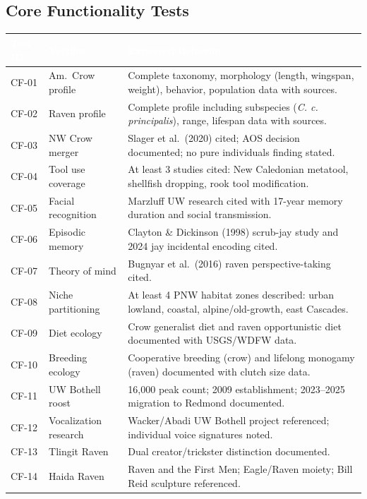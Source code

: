 \documentclass[11pt,letterpaper]{article}
\newcommand{\tableheader}[1]{\textbf{\sffamily\textcolor{white}{#1}}}
\begin{document}
\subsection{Core Functionality Tests}

\begin{center}
\begin{tabularx}{\textwidth}{C{1.2cm}L{3.5cm}X}
\toprule
{}
\tableheader{Test ID} & \tableheader{Verifies} & \tableheader{Expected Behavior} \\
\midrule
CF-01 & Am.\ Crow profile & Complete taxonomy, morphology (length, wingspan, weight), behavior, population data with sources. \\
CF-02 & Raven profile & Complete profile including subspecies (\textit{C. c. principalis}), range, lifespan data with sources. \\
CF-03 & NW Crow merger & Slager et al.\ (2020) cited; AOS decision documented; no pure individuals finding stated. \\
CF-04 & Tool use coverage & At least 3 studies cited: New Caledonian metatool, shellfish dropping, rook tool modification. \\
CF-05 & Facial recognition & Marzluff UW research cited with 17-year memory duration and social transmission. \\
CF-06 & Episodic memory & Clayton \& Dickinson (1998) scrub-jay study and 2024 jay incidental encoding cited. \\
CF-07 & Theory of mind & Bugnyar et al.\ (2016) raven perspective-taking cited. \\
CF-08 & Niche partitioning & At least 4 PNW habitat zones described: urban lowland, coastal, alpine/old-growth, east Cascades. \\
CF-09 & Diet ecology & Crow generalist diet and raven opportunistic diet documented with USGS/WDFW data. \\
CF-10 & Breeding ecology & Cooperative breeding (crow) and lifelong monogamy (raven) documented with clutch size data. \\
CF-11 & UW Bothell roost & 16,000 peak count; 2009 establishment; 2023--2025 migration to Redmond documented. \\
CF-12 & Vocalization research & Wacker/Abadi UW Bothell project referenced; individual voice signatures noted. \\
CF-13 & Tlingit Raven & Dual creator/trickster distinction documented. \\
CF-14 & Haida Raven & Raven and the First Men; Eagle/Raven moiety; Bill Reid sculpture referenced. \\

\end{tabularx}
\end{center}
\end{document}
